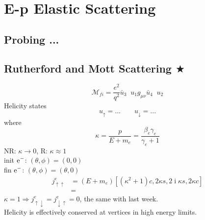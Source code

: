 \documentclass[a4paper]{article}
\DeclareMathOperator{\I}{\mathrm{i}}
\DeclareMathOperator{\ra}{\rightarrow}
\DeclareMathOperator{\dra}{\Rightarrow}
\DeclareMathOperator{\gmuu}{\gamma^\mu}
\DeclareMathOperator{\gnuu}{\gamma^\nu}
\numberwithin{equation}{section}
\begin{document}
\section{E-p Elastic Scattering}
\subsection{Probing ...}

\subsection{Rutherford and Mott Scattering $ \bigstar $}
\begin{equation}\label{key}
\mathcal{M}_{fi} = \dfrac{e^2}{q^2} \bar{u}_3 \gmuu u_1 g_{\mu\nu} \bar{u}_4 \gnuu u_2
\end{equation}
Helicity states
\begin{equation}\label{key}
u_\uparrow = ... \qquad u_\downarrow = ...
\end{equation}
where
\begin{equation}\label{key}
\kappa = \dfrac{p}{E + m_e} = \dfrac{\beta_e \gamma_e}{\gamma_e + 1}
\end{equation}
NR: $ \kappa \ra 0 $, R: $ \kappa \approx 1 $\\
init $ \ce{e^-} $: $ (\theta, \phi)  = (0,0)$\\
fin $ \ce{e^-} $: $ (\theta, \phi)  = (\theta,0)$\\
\begin{equation}\label{key}
\begin{aligned}
j^e_{\uparrow\uparrow} &= (E + m_e)[(\kappa^2 + 1)c, 2\kappa s, 2\I\kappa s, 2\kappa c]\\
&=
\end{aligned}
\end{equation}
$ \kappa = 1 \dra j^e_{\uparrow\downarrow} = j^e_{\downarrow\uparrow} = 0 $, the same with last week.\\
Helicity is effectively conserved at vertices in high energy limits.\\
\end{document}
